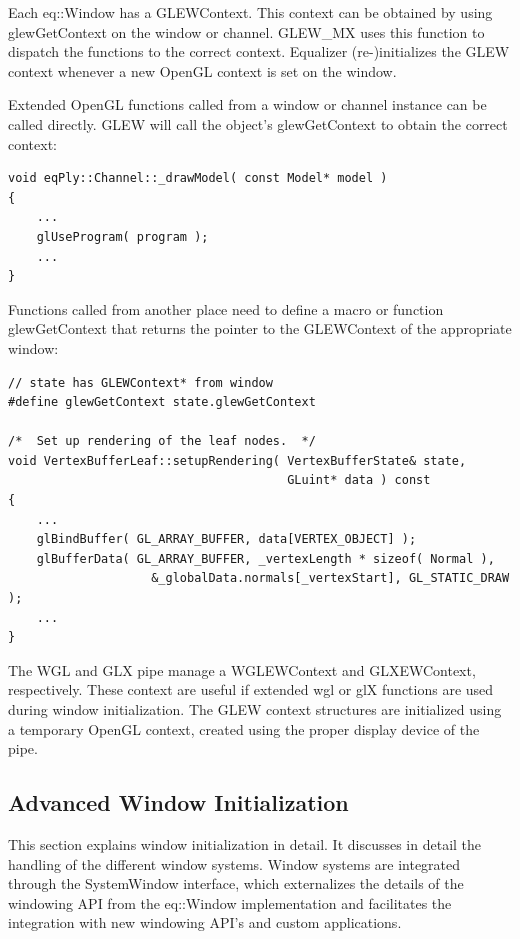 \documentclass[10pt,a4]{scrartcl}
\begin{document}
Each \textsf{eq::Window} has a \textsf{GLEWContext}. This context can be
obtained by using \textsf{glewGetContext} on the window or channel. GLEW\_MX
uses this function to dispatch the functions to the correct context. Equalizer
(re-)initializes the GLEW context whenever a new OpenGL context is set on the
window.

Extended OpenGL functions called from a window or channel instance can
be called directly. GLEW will call the object's \textsf{glewGetContext}
to obtain the correct context:

{\footnotesize\begin{lstlisting}
void eqPly::Channel::_drawModel( const Model* model )
{
    ...
    glUseProgram( program );
    ...
}
\end{lstlisting}}

Functions called from another place need to define a macro or function
\textsf{glewGetContext} that returns the pointer to the GLEWContext of
the appropriate window:

{\footnotesize\begin{lstlisting}
// state has GLEWContext* from window
#define glewGetContext state.glewGetContext

/*  Set up rendering of the leaf nodes.  */
void VertexBufferLeaf::setupRendering( VertexBufferState& state,
                                       GLuint* data ) const
{
    ...
    glBindBuffer( GL_ARRAY_BUFFER, data[VERTEX_OBJECT] );
    glBufferData( GL_ARRAY_BUFFER, _vertexLength * sizeof( Normal ),
                    &_globalData.normals[_vertexStart], GL_STATIC_DRAW );
    ...
}
\end{lstlisting}}

The WGL and GLX pipe manage a WGLEWContext and GLXEWContext, respectively. These
context are useful if extended wgl or glX functions are used during window
initialization. The GLEW context structures are initialized using a temporary
OpenGL context, created using the proper display device of the pipe.

\subsection{Advanced Window Initialization}

This section explains window initialization in detail. It discusses in
detail the handling of the different window systems. Window systems are
integrated through the \textsf{SystemWindow} interface, which externalizes
the details of the windowing API from the \textsf{eq::Window}
implementation and facilitates the integration with new windowing API's
and custom applications.
\end{document}

